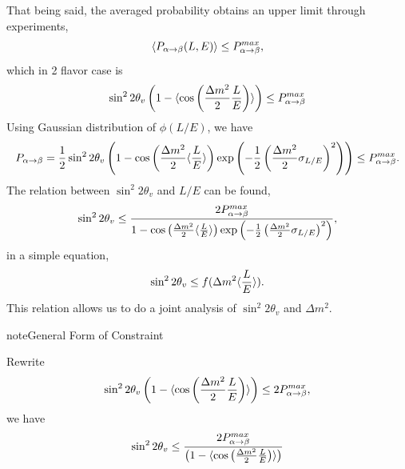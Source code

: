 \documentclass[letterpaper,12pt,english]{sphinxmanual}
\begin{document}
That being said, the averaged probability obtains an upper limit through experiments,
\begin{gather}
\begin{split}\langle P_{\alpha\to\beta}(L,E) \rangle \leq P_{\alpha\to\beta}^{max},\end{split}\notag
\end{gather}
which in 2 flavor case is
\begin{gather}
\begin{split}\sin^2 2\theta_v \left( 1- \langle \cos\left( \frac{\Delta m^2}{2} \frac{L}{E} \right) \rangle \right)   \leq P_{\alpha\to\beta}^{max}\end{split}\notag
\end{gather}
Using Gaussian distribution of \(\phi(L/E)\), we have \footnotemark[1]
\begin{gather}
\begin{split}P_{\alpha\to\beta} = \frac{1}{2} \sin^2 2\theta_v \left( 1 - \cos \left( \frac{\Delta m^2}{2} \langle \frac{L}{E}\rangle \right) \exp\left( -\frac{1}{2} \left( \frac{\Delta m^2}{2} \sigma_{L/E} \right)^2 \right) \right) \leq P_{\alpha\to\beta}^{max}.\end{split}\notag
\end{gather}
The relation between \(\sin^2 2\theta_v\) and \(L/E\) can be found,
\begin{gather}
\begin{split}\sin^2 2\theta_v \leq \frac{2 P_{\alpha\to\beta}^{max} }{1 - \cos \left( \frac{\Delta m^2}{2} \langle \frac{L}{E}\rangle \right) \exp\left( -\frac{1}{2} \left( \frac{\Delta m^2}{2} \sigma_{L/E} \right)^2 \right) },\end{split}\notag
\end{gather}
in a simple equation,
\begin{gather}
\begin{split}\sin^2 2\theta_v \leq f(\Delta m^2 \langle \frac{L}{E} \rangle ).\end{split}\notag
\end{gather}
This relation allows us to do a joint analysis of \(\sin^2 2\theta_v\) and \(\Delta m^2\).

\begin{notice}{note}{General Form of Constraint}

Rewrite
\begin{gather}
\begin{split}\sin^2 2\theta_v \left( 1- \langle \cos\left( \frac{\Delta m^2}{2} \frac{L}{E} \right) \rangle \right)   \leq 2 P_{\alpha\to\beta}^{max},\end{split}\notag
\end{gather}
we have
\begin{gather}
\begin{split}\sin^2 2\theta_v    \leq  \frac{ 2 P_{\alpha\to\beta}^{max} }{ \left( 1- \langle \cos\left( \frac{\Delta m^2}{2} \frac{L}{E} \right) \rangle \right) }\end{split}\notag
\end{gather}\end{notice}
\end{document}
